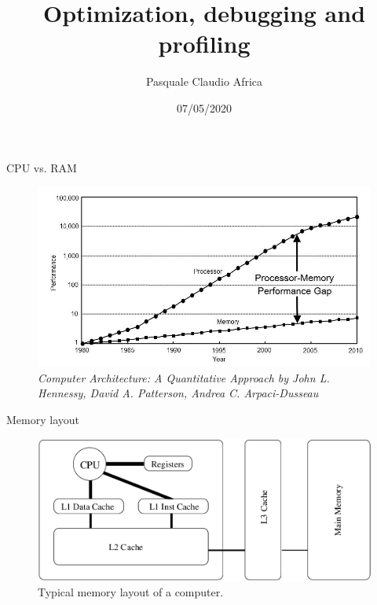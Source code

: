 \documentclass[10pt]{beamer}
\begin{document}
    \title{Optimization, debugging and profiling}
    \author{Pasquale Claudio Africa}
    \date{07/05/2020}

\begin{frame}
    \maketitle
\end{frame}

\begin{frame}{CPU vs. RAM}
    \begin{figure}
        \centering
        \includegraphics[width=\textwidth]{images/cpu_memory_performance_gap.png}
        \caption{\textit{Computer Architecture: A Quantitative Approach by John L. Hennessy, David A. Patterson, Andrea C. Arpaci-Dusseau}}
    \end{figure}
\end{frame}

\begin{frame}{Memory layout}
    \begin{figure}
        \centering
        \includegraphics[width=\textwidth]{images/memory_layout.png}
        \caption{Typical memory layout of a computer.}
    \end{figure}
\end{frame}
\end{document}
